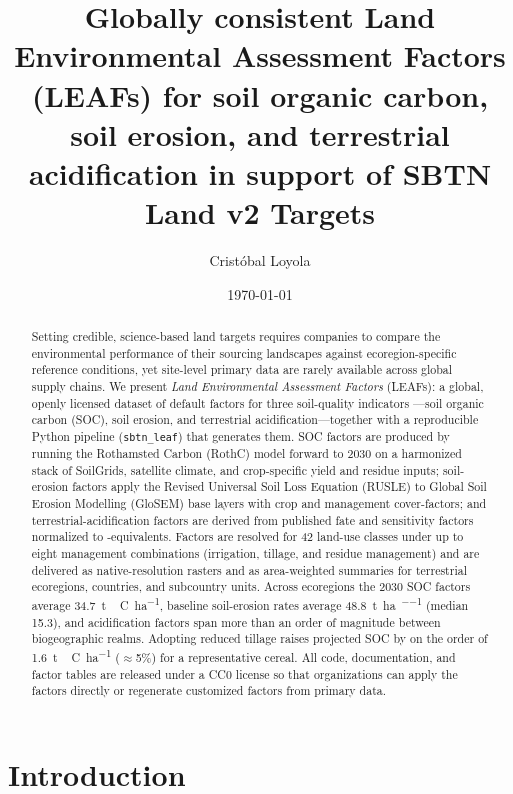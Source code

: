 \documentclass[11pt]{article}
\title{\textbf{Globally consistent Land Environmental Assessment Factors (LEAFs)
for soil organic carbon, soil erosion, and terrestrial acidification
in support of SBTN Land v2 Targets}}
\author[1]{Cristóbal Loyola}
\affil[1]{World Wildlife Fund (WWF), Washington, DC, USA \\ \texttt{cristobal.loyola@wwfus.org}}
\date{\today}
\begin{document}
\maketitle

\begin{abstract}
\noindent
Setting credible, science-based land targets requires companies to compare the
environmental performance of their sourcing landscapes against ecoregion-specific
reference conditions, yet site-level primary data are rarely available across global
supply chains. We present \emph{Land Environmental Assessment Factors} (LEAFs): a
global, openly licensed dataset of default factors for three soil-quality indicators
---soil organic carbon (SOC), soil erosion, and terrestrial acidification---together
with a reproducible Python pipeline (\texttt{sbtn\_leaf}) that generates them. SOC
factors are produced by running the Rothamsted Carbon (RothC) model forward to 2030
on a harmonized stack of SoilGrids, satellite climate, and crop-specific yield and
residue inputs; soil-erosion factors apply the Revised Universal Soil Loss Equation
(RUSLE) to Global Soil Erosion Modelling (GloSEM) base layers with crop and
management cover-factors; and terrestrial-acidification factors are derived from
published fate and sensitivity factors normalized to -equivalents. Factors are
resolved for 42 land-use classes under up to eight management combinations (irrigation,
tillage, and residue management) and are delivered as native-resolution rasters and as
area-weighted summaries for terrestrial ecoregions, countries, and subcountry units.
Across ecoregions the 2030 SOC factors average \SI{34.7}{\tonne\,C\per\hectare},
baseline soil-erosion rates average \SI{48.8}{\tonne\per\hectare\per\year} (median
\SI{15.3}{}), and acidification factors span more than an order of magnitude between
biogeographic realms. Adopting reduced tillage raises projected SOC by on the order of
\SI{1.6}{\tonne\,C\per\hectare} (\(\approx\)5\%) for a representative cereal. All code,
documentation, and factor tables are released under a CC0 license so that organizations
can apply the factors directly or regenerate customized factors from primary data.
\end{abstract}

\section{Introduction}
\label{sec:intro}
\end{document}
